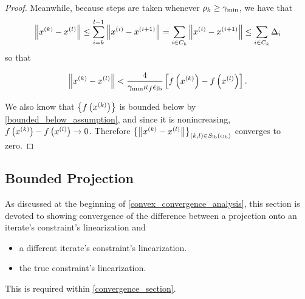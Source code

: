 \begin{proof}
Meanwhile, because steps are taken whenever $\rho_k \ge \gamma_{\textrm{min}}$, we have that
\begin{align*}
\left\|x^{(k)} - {x^{(l)}}\right\| \le \sum_{i = k}^{l-1}\left\|x^{(i)} - x^{(i+1)}\right\| = \sum_{i \in C_k}\left\|x^{(i)} - x^{(i+1)}\right\| \le \sum_{i \in C_k} \Delta_i
\end{align*}
so that

\begin{align}
\left\|x^{(k)} - {x^{(l)}}\right\| < \frac{4}{\gamma_{\textrm{min}} \kappa_f {\epsilon_{\textrm{lb}}}} \left[ f\left(x^{(k)}\right) - f\left({x^{(l)}}\right)\right].
\end{align}


We also know that $\left\{f\left(x^{(k)}\right)\right\}$ is bounded below by \cref{bounded_below_assumption}, 
and since it is nonincreasing, $f\left(x^{(k)}\right)  - f\left({x^{(l)}}\right) \to 0$.
Therefore $\left\{\left\|x^{(k)} - {x^{(l)}}\right\|\right\}_{(k,l) \in {S_{\textrm{lb}}\left(\epsilon_{\textrm{lb}}\right)}}$ converges to zero.
\end{proof}


\subsection{Bounded Projection}
\label{bounding_the_projection_section}
As discussed at the beginning of \cref{convex_convergence_analysis}, this section is devoted to showing convergence of the difference
between a projection onto an iterate's constraint's linearization and
\begin{itemize}
\item a different iterate's constraint's linearization.
\item the true constraint's linearization.
\end{itemize}
This is required within \cref{convergence_section}.


